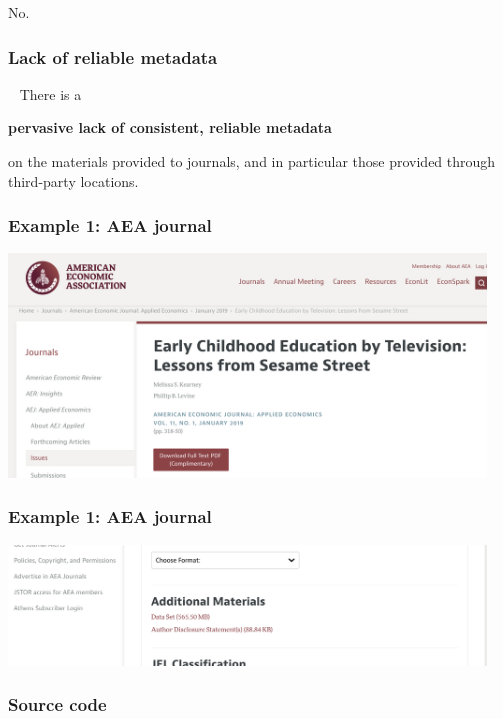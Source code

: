 \begin{frame}
\begin{center}
	\huge	No.
\end{center}
\end{frame}



\begin{frame}
\frametitle{Lack of reliable metadata}
\begin{block}{\ }
	\large
 There is a 
 \begin{center}
 	\textbf{pervasive lack of consistent, reliable metadata} 
 \end{center}
on the materials provided to journals, and in particular those provided through third-party locations.
\end{block}
\end{frame}



\begin{frame}
\frametitle{Example 1: AEA journal}
\includegraphics[width=0.95\textwidth]{images/aeaweb-screenshot1.png}
\end{frame}

\begin{frame}
\frametitle{Example 1: AEA journal}
\includegraphics[width=0.95\textwidth]{images/aeaweb-screenshot2.png}
\end{frame}


\begin{frame}
\frametitle{Source code}

\end{frame}

